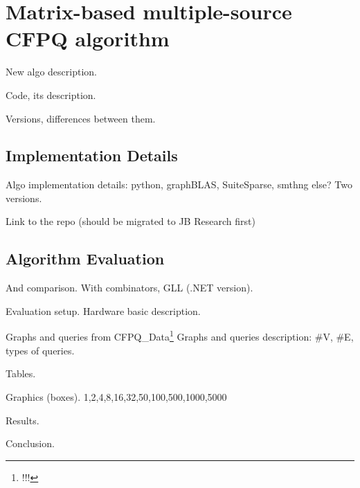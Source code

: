 \section{Matrix-based multiple-source CFPQ algorithm}

New algo description.

Code, its description.

Versions, differences between them.

\subsection{Implementation Details}

Algo implementation details: python, graphBLAS, SuiteSparse, smthng else? Two versions.

Link to the repo (should be migrated to JB Research first)

\subsection{Algorithm Evaluation}

And comparison. With combinators, GLL (.NET version).

Evaluation setup.
Hardware basic description.

Graphs and queries from CFPQ\_Data\footnote{!!!}
Graphs and queries description: \#V, \#E, types of queries.

Tables.

Graphics (boxes). 1,2,4,8,16,32,50,100,500,1000,5000

Results.

Conclusion. 